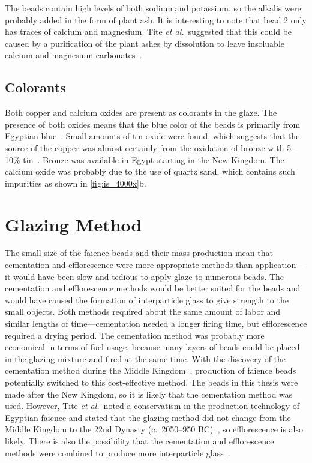 The beads contain high levels of both sodium and potassium, so the alkalis were probably added in the form of plant ash. It is interesting to note that bead 2 only has traces of calcium and magnesium. Tite \emph{et al.}\ suggested that this could be caused by a purification of the plant ashes by dissolution to leave insoluable calcium and magnesium carbonates~\cite{tite07}.

\subsection{Colorants}

Both copper and calcium oxides are present as colorants in the glaze. The presence of both oxides means that the blue color of the beads is primarily from Egyptian blue~\cite{kaczmarczyk83,lucas62}. Small amounts of tin oxide were found, which suggests that the source of the copper was almost certainly from the oxidation of bronze with 5--10\% tin~\cite{tite07}. Bronze was available in Egypt starting in the New Kingdom. The calcium oxide was probably due to the use of quartz sand, which contains such impurities as shown in \autoref{fig:is_4000x}b.

\section{Glazing Method}

The small size of the faience beads and their mass production mean that cementation and efflorescence were more appropriate methods than application---it would have been slow and tedious to apply glaze to numerous beads. The cementation and efflorescence methods would be better suited for the beads and would have caused the formation of interparticle glass to give strength to the small objects. Both methods required about the same amount of labor and similar lengths of time---cementation needed a longer firing time, but efflorescence required a drying period. The cementation method was probably more economical in terms of fuel usage, because many layers of beads could be placed in the glazing mixture and fired at the same time. With the discovery of the cementation method during the Middle Kingdom~\cite{nicholson00}, production of faience beads potentially switched to this cost-effective method. The beads in this thesis were made after the New Kingdom, so it is likely that the cementation method was used. However, Tite \emph{et al.}\ noted a conservatism in the production technology of Egyptian faience and stated that the glazing method did not change from the Middle Kingdom to the 22nd Dynasty (c.\ 2050--950 BC)~\cite{tite07}, so efflorescence is also likely. There is also the possibility that the cementation and efflorescence methods were combined to produce more interparticle glass~\cite{vandiver83}.

